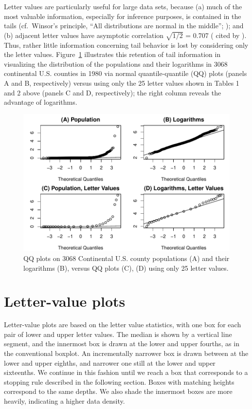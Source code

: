 \documentclass[oneside]{article}
\begin{document}
Letter values are particularly useful for large data sets, because (a) much of the most valuable information, especially for inference purposes, is contained in the tails (cf.\ Winsor's principle, ``All distributions are normal in the middle''; \citep[pg. 457]{tukey60}); and (b) adjacent letter values have asymptotic correlation $\sqrt{1/2}$ = 0.707 (\citet{mosteller46} cited by \citet[pg. 51--52]{dchlv}). Thus, rather little information concerning tail behavior is lost by considering only the letter values. Figure~\ref{qqpop4} illustrates this retention of tail information in visualizing the distribution of the populations and their logarithms in 3068 continental U.S. counties in 1980 via normal quantile-quantile (QQ) plots (panels A and B, respectively) versus using only the 25 letter values shown in Tables 1 and 2 above (panels C and D, respectively); the right column reveals the advantage of logarithms.

\begin{figure}[hbtp]
  \centering
  \includegraphics[width = 0.75 \linewidth]{counties-qq}

  \caption{QQ plots on 3068 Continental U.S. county populations (A) and their
  logarithms (B), versus QQ plots (C), (D) using only 25 letter values.}
  \label{qqpop4}
\end{figure}

\section{Letter-value plots}
\label{sec:lv-boxplots}

Letter-value plots are based on the letter value statistics, with one box for each pair of lower and upper letter values. The median is shown by a vertical line segment, and the innermost box is drawn at the lower and upper fourths, as in the conventional boxplot. An incrementally narrower box is drawn between at the lower and upper eighths, and narrower one still at the lower and upper sixteenths. We continue in this fashion until we reach a box that corresponds to a stopping rule described in the following section. Boxes with matching heights correspond to the same depths. We also shade the innermost boxes are more heavily, indicating a higher data density. 
\end{document}
